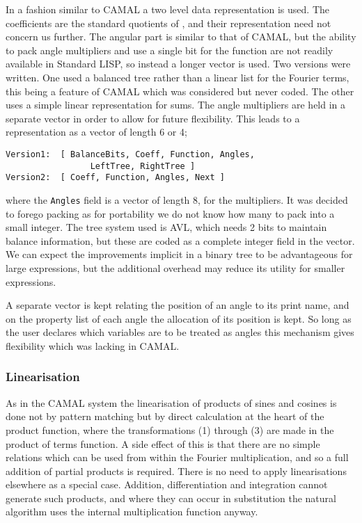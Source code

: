 In a fashion similar to CAMAL a two level data representation is used.
The coefficients are the standard quotients of \REDUCE, and their
representation need not concern us further.  The angular part is
similar to that of CAMAL, but the ability to pack angle multipliers
and use a single bit for the function are not readily available in
Standard LISP, so instead a longer vector is used.  Two versions were
written.  One used a balanced tree rather than a linear list for the
Fourier terms, this being a feature of CAMAL which was considered but
never coded.  The other uses a simple linear representation for sums.
The angle multipliers are held in a separate vector in order to allow
for future flexibility.  This leads to a representation as a vector of
length 6 or 4;
\begin{verbatim}
Version1:  [ BalanceBits, Coeff, Function, Angles,
                 LeftTree, RightTree ]
Version2:  [ Coeff, Function, Angles, Next ]
\end{verbatim}
where the \texttt{Angles} field is a vector of length 8, for the
multipliers.  It was decided to forego packing as for portability we
do not know how many to pack into a small integer.  The tree system
used is AVL, which needs 2 bits to maintain balance information, but
these are coded as a complete integer field in the vector.  We can
expect the improvements implicit in a binary tree to be advantageous
for large expressions, but the additional overhead may reduce its
utility for smaller expressions.

A separate vector is kept relating the position of an angle to its
print name, and on the property list of each angle the allocation of
its position is kept.  So long as the user declares which variables
are to be treated as angles this mechanism gives flexibility which was
lacking in CAMAL.

\subsubsection{Linearisation}

As in the CAMAL system the linearisation of products of sines and
cosines is done not by pattern matching but by direct calculation at
the heart of the product function, where the transformations (1)
through (3) are made in the product of terms function.  A side effect
of this is that there are no simple relations which can be used from
within the Fourier multiplication, and so a full addition of partial
products is required.  There is no need to apply linearisations
elsewhere as a special case.  Addition, differentiation and
integration cannot generate such products, and where they can occur in
substitution the natural algorithm uses the internal multiplication
function anyway.

